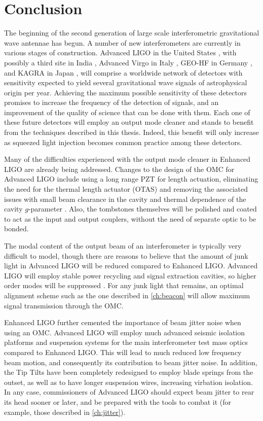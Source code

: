 \chapter{Conclusion}
\label{ch:conclusion}

The beginning of the second generation of large scale interferometric gravitational wave antennae has begun. %
A number of new interferometers are currently in various stages of construction. %
Advanced LIGO in the United States \cite{aLIGO}, with possibly a third site in India \cite{M1100296}, Advanced Virgo in Italy \cite{aVirgo}, GEO-HF in Germany \cite{GEOHF}, and KAGRA in Japan \cite{KAGRA}, will comprise a worldwide network of detectors with sensitivity expected to yield several gravitational wave signals of astrophysical origin per year. %
Achieving the maximum possible sensitivity of these detectors promises to increase the frequency of the detection of signals, and an improvement of the quality of science that can be done with them. %
Each one of these future detectors will employ an output mode cleaner and stands to benefit from the techniques described in this thesis. %
Indeed, this benefit will only increase as squeezed light injection becomes common practice among these detectors.

Many of the difficulties experienced with the output mode cleaner in Enhanced LIGO are already being addressed. %
Changes to the design of the OMC for Advanced LIGO include using a long range PZT for length actuation, eliminating the need for the thermal length actuator (OTAS) and removing the associated issues with small beam clearance in the cavity and thermal dependence of the cavity $g$-parameter \cite{T1000276,T0900157}. %
Also, the tombstones themselves will be polished and coated to act as the input and output couplers, without the need of separate optic to be bonded. %
 

The modal content of the output beam of an interferometer is typically very difficult to model, though there are reasons to believe that the amount of junk light in Advanced LIGO will be reduced compared to Enhanced LIGO. %
Advanced LIGO will employ stable power recycling and signal extraction cavities, so higher order modes will be suppressed \cite{T080208}. %
For any junk light that remains, an optimal alignment scheme such as the one described in \ref{ch:beacon} will allow maximum signal transmission through the OMC.

Enhanced LIGO further cemented the importance of beam jitter noise when using an OMC. %
Advanced LIGO will employ much advanced seismic isolation platforms \cite{BSCISI} and suspension systems \cite{quaddesign} for the main interferometer test mass optics compared to Enhanced LIGO. %
This will lead to much reduced low frequency beam motion, and consequently its contribution to beam jitter noise. %
In addition, the Tip Tilts have been completely redesigned to employ blade springs from the outset, as well as to have longer suspension wires, increasing virbation isolation. %
In any case, commissioners of Advanced LIGO should expect beam jitter to rear its head sooner or later, and be prepared with the tools to combat it (for example, those described in \ref{ch:jitter}).

